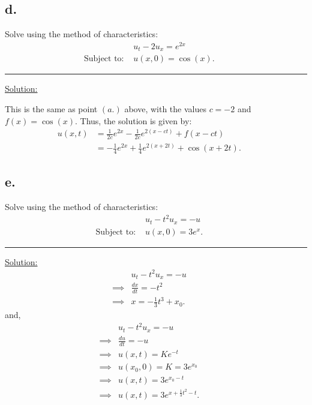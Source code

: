 \documentclass{article}
\begin{document}
\newpage

\subsection*{d.}
Solve using the method of characteristics:
\begin{align*}
  &u_t - 2 u_x = e^{2x} &&\\
  \text{Subject to: }& u(x,0) = \cos(x).
\end{align*}

\begin{center}
  \noindent\rule{8cm}{0.4pt}
\end{center}

\underline{Solution:}

This is the same as point $(a.)$ above, with the values $c=-2$ and $f(x)=\cos(x)$. Thus, the solution is given by:
\begin{align*}
  u(x,t) &= \frac{1}{2c} e^{2x} - \frac{1}{2c} e^{2(x-ct)} + f(x-ct) &&\\
  &= -\frac{1}{4} e^{2x} + \frac{1}{4} e^{2(x+2t)} + \cos(x+2t).
\end{align*}

\newpage

\subsection*{e.}
Solve using the method of characteristics:
\begin{align*}
  &u_t - t^2 u_x = -u &&\\
  \text{Subject to: }& u(x,0) = 3 e^x.
\end{align*}

\begin{center}
  \noindent\rule{8cm}{0.4pt}
\end{center}

\underline{Solution:}
\begin{align*}
  &u_t - t^2 u_x = -u &&\\
  \implies& \frac{dx}{dt} = -t^2 &&\\
  \implies& x = - \frac{1}{3} t^3 + x_0.
\end{align*}
and,
\begin{align*}
  &u_t - t^2 u_x = -u &&\\
  \implies& \frac{du}{dt} = -u &&\\
  \implies& u(x,t) = Ke^{-t} &&\\
  \implies& u(x_0,0) = K = 3e^{x_0} &&\\
  \implies& u(x,t) = 3e^{x_0-t} &&\\
  \implies& u(x,t) = 3e^{x+\frac{1}{3}t^2-t}.
\end{align*}
\end{document}

